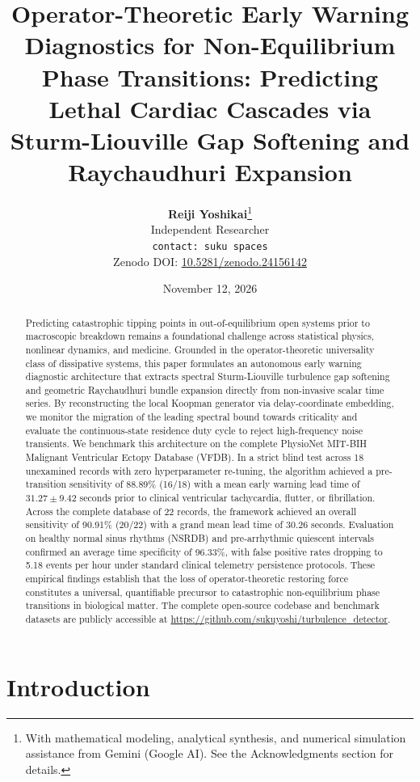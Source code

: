 \documentclass[11pt,a4paper]{article}
\title{\textbf{Operator-Theoretic Early Warning Diagnostics for Non-Equilibrium Phase Transitions: Predicting Lethal Cardiac Cascades via Sturm-Liouville Gap Softening and Raychaudhuri Expansion}}
\author{
    \textbf{Reiji Yoshikai}\thanks{With mathematical modeling, analytical synthesis, and numerical simulation assistance from Gemini (Google AI). See the Acknowledgments section for details.} \\
    \small Independent Researcher \\
    \small \texttt{contact: suku spaces} \\
    \small Zenodo DOI: \href{https://doi.org/10.5281/zenodo.24156142}{10.5281/zenodo.24156142}
}
\date{November 12, 2026}
\begin{document}
\maketitle

\begin{abstract}
Predicting catastrophic tipping points in out-of-equilibrium open systems prior to macroscopic breakdown remains a foundational challenge across statistical physics, nonlinear dynamics, and medicine. Grounded in the operator-theoretic universality class of dissipative systems, this paper formulates an autonomous early warning diagnostic architecture that extracts spectral Sturm-Liouville turbulence gap softening and geometric Raychaudhuri bundle expansion directly from non-invasive scalar time series. By reconstructing the local Koopman generator via delay-coordinate embedding, we monitor the migration of the leading spectral bound towards criticality and evaluate the continuous-state residence duty cycle to reject high-frequency noise transients. We benchmark this architecture on the complete PhysioNet MIT-BIH Malignant Ventricular Ectopy Database (VFDB). In a strict blind test across 18 unexamined records with zero hyperparameter re-tuning, the algorithm achieved a pre-transition sensitivity of 88.89\% (16/18) with a mean early warning lead time of $31.27 \pm 9.42$ seconds prior to clinical ventricular tachycardia, flutter, or fibrillation. Across the complete database of 22 records, the framework achieved an overall sensitivity of 90.91\% (20/22) with a grand mean lead time of $30.26$ seconds. Evaluation on healthy normal sinus rhythms (NSRDB) and pre-arrhythmic quiescent intervals confirmed an average time specificity of 96.33\%, with false positive rates dropping to 5.18 events per hour under standard clinical telemetry persistence protocols. These empirical findings establish that the loss of operator-theoretic restoring force constitutes a universal, quantifiable precursor to catastrophic non-equilibrium phase transitions in biological matter. The complete open-source codebase and benchmark datasets are publicly accessible at \url{https://github.com/sukuyoshi/turbulence_detector}.
\end{abstract}

\section{Introduction}
\end{document}
